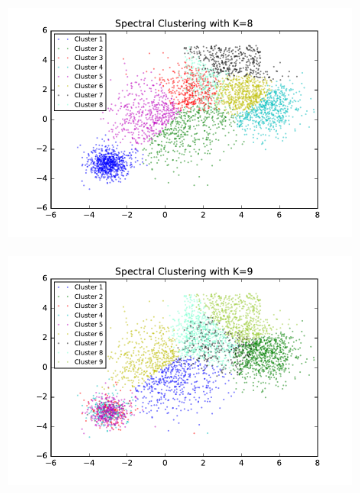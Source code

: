 \begin{description}
\begin{description}
\begin{figure}[!h]
\begin{subfigure}[b]{0.475\textwidth}
        \end{subfigure}
        \hfill
        \begin{subfigure}[b]{0.475\textwidth}  
            \centering 
            \includegraphics[width=\textwidth]{./figures/bigClustering_spectral_8.pdf}
        \end{subfigure}
        \begin{subfigure}[b]{0.475\textwidth}   
            \centering 
            \includegraphics[width=\textwidth]{./figures/bigClustering_spectral_9.pdf}
        \end{subfigure}
        \hfill
        \begin{subfigure}[b]{0.475\textwidth}   
            \centering 

\end{subfigure}
\end{figure}
\end{description}
\end{description}
